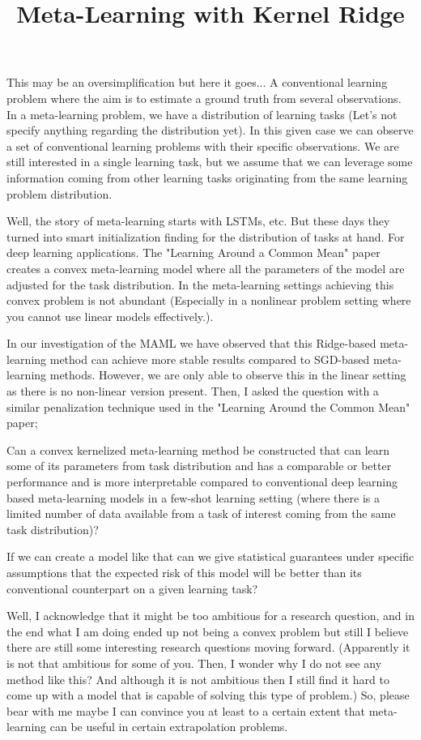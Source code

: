 \documentclass{tran-l}
\title{Meta-Learning with Kernel Ridge}
\theoremstyle{definition}
\theoremstyle{remark}
\numberwithin{equation}{section}
\begin{document}
\maketitle

\rem This may be an oversimplification but here it goes...  A conventional learning problem where the aim is to estimate a ground truth from several observations. In a meta-learning problem, we have a distribution of learning tasks (Let's not specify anything regarding the distribution yet). In this given case we can observe a set of conventional learning problems with their specific observations. We are still interested in a single learning task, but we assume that we can leverage some information coming from other learning tasks originating from the same learning problem distribution. 

Well, the story of meta-learning starts with LSTMs, etc. But these days they turned into smart initialization finding for the distribution of tasks at hand. For deep learning applications. The "Learning Around a Common Mean" paper creates a convex meta-learning model where all the parameters of the model are adjusted for the task distribution. In the meta-learning settings achieving this convex problem is not abundant (Especially in a nonlinear problem setting where you cannot use linear models effectively.).


\rem In our investigation of the MAML we have observed that this Ridge-based meta-learning method can achieve more stable results compared to SGD-based meta-learning methods. However, we are only able to observe this in the linear setting as there is no non-linear version present. Then, I asked the question with a similar penalization technique used in the "Learning Around the Common Mean" paper;
 
\requ Can a convex kernelized meta-learning method be constructed that can learn some of its parameters from task distribution and has a comparable or better performance and is more interpretable compared to conventional deep learning based meta-learning models in a few-shot learning setting (where there is a limited number of data available from a task of interest coming from the same task distribution)?

\requ If we can create a model like that can we give statistical guarantees under specific assumptions that the expected risk of this model will be better than its conventional counterpart on a given learning task?

Well, I acknowledge that it might be too ambitious for a research question, and in the end what I am doing ended up not being a convex problem but still I believe there are still some interesting research questions moving forward. \color{red} (Apparently it is not that ambitious for some of you. Then, I wonder why I do not see any method like this? And although it is not ambitious then I still find it hard to come up with a model that is capable of solving this type of problem.) So, please bear with me maybe I can convince you at least to a certain extent that meta-learning can be useful in certain extrapolation problems. \color{black}
\end{document}

